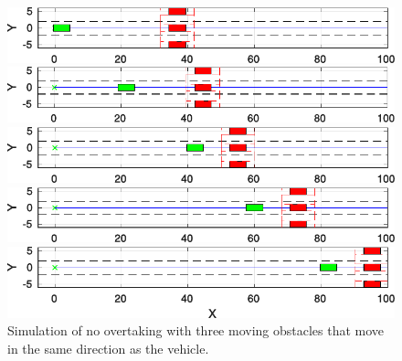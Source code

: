 \begin{figure}[h!]
	\centering
	\begin{minipage}[t]{\textwidth}
		\includegraphics[width=\textwidth]{../figure/no_overtaking/no_overtaking_1.pdf}
	\end{minipage}
	\begin{minipage}[t]{\textwidth}
		\includegraphics[width=\textwidth]{../figure/no_overtaking/no_overtaking_1_5.pdf}
	\end{minipage}
	\begin{minipage}[t]{\textwidth}
		\includegraphics[width=\textwidth]{../figure/no_overtaking/no_overtaking_2.pdf}
	\end{minipage}
	\begin{minipage}[t]{\textwidth}
		\includegraphics[width=\textwidth]{../figure/no_overtaking/no_overtaking_3.pdf}
	\end{minipage}
	\begin{minipage}[t]{\textwidth}
		\includegraphics[width=\textwidth]{../figure/no_overtaking/no_overtaking_4.pdf}
	\end{minipage}
	\caption{Simulation of no overtaking with three moving obstacles that move in the same direction as the vehicle.}
	\label{fig:obstacleAvoidance_no_overtaking}
\end{figure}

